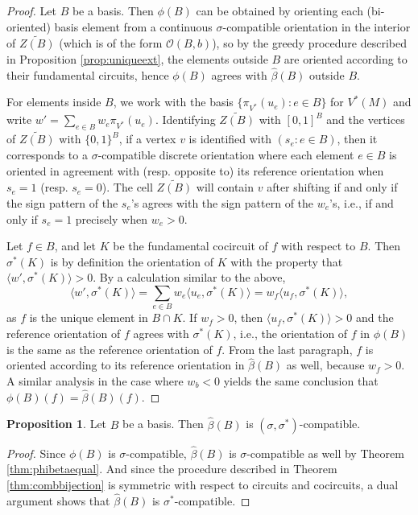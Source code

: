 \documentclass[12pt]{amsart}
\numberwithin{equation}{section}
\theoremstyle{definition}
\newtheorem{proposition}[theorem]{Proposition}
\begin{document}
\begin{proof}

Let $B$ be a basis. Then $\phi(B)$ can be obtained by orienting each (bi-oriented) basis element from a continuous $\sigma$-compatible orientation in the interior of $\widetilde{Z(B)}$ (which is of the form $\mathcal{O}(B,b)$), so by the greedy procedure described in Proposition \ref{prop:uniqueext}, the elements outside $B$ are oriented according to their fundamental circuits, hence $\phi(B)$ agrees with $\hat{\beta}(B)$ outside $B$.

For elements inside $B$, we work with the basis $\{\pi_{V^*}(u_e):e\in B\}$ for $V^*(M)$ and write $w'=\sum_{e\in B}w_e\pi_{V^*}(u_e)$. 
Identifying $\widetilde{Z(B)}$ with $[0,1]^B$ and the vertices of $\widetilde{Z(B)}$ with $\{0,1\}^B$, if a vertex $v$ is identified with $(s_e:e\in B)$, then it corresponds to a $\sigma$-compatible discrete orientation where each element $e\in B$ is oriented in agreement with (resp. opposite to) its reference orientation when $s_e=1$ (resp. $s_e=0$). The cell $\widetilde{Z(B)}$ will contain $v$ after shifting if and only if the sign pattern of the $s_e$'s agrees with the sign pattern of the $w_e$'s, i.e., if and only if $s_e=1$ precisely when $w_e>0$.

Let $f \in B$, and let $K$ be the fundamental cocircuit of $f$ with respect to $B$.  Then $\sigma^*(K)$ is by definition the orientation of $K$ with the property that $\langle w',\sigma^*(K)\rangle>0$. By a calculation similar to the above, 
\[
\langle w',\sigma^*(K)\rangle=\sum_{e\in B}w_e\langle u_e, \sigma^*(K)\rangle=w_f\langle u_f, \sigma^*(K)\rangle,
\]
as $f$ is the unique element in $B\cap K$. If $w_f>0$, then $\langle u_f, \sigma^*(K)\rangle>0$ and the reference orientation of $f$ agrees with $\sigma^*(K)$, i.e., the orientation of $f$ in $\phi(B)$ is the same as the reference orientation of $f$. From the last paragraph, $f$ is oriented according to its reference orientation in $\hat{\beta}(B)$ as well, because $w_f>0$. A similar analysis in the case where $w_b<0$ yields the same conclusion that $\phi(B)(f)=\hat{\beta}(B)(f)$.
\end{proof}

\begin{proposition}\label{prop:betaCCM}
Let $B$ be a basis. Then $\hat{\beta}(B)$ is $(\sigma,\sigma^*)$-compatible.
\end{proposition}

\begin{proof} Since $\phi(B)$ is $\sigma$-compatible, $\hat{\beta}(B)$ is $\sigma$-compatible as well by Theorem \ref{thm:phibetaequal}.  And since the procedure described in Theorem \ref{thm:combbijection} is symmetric with respect to circuits and cocircuits, a dual argument shows that $\hat{\beta}(B)$ is $\sigma^*$-compatible.
\end{proof}
\end{document}
